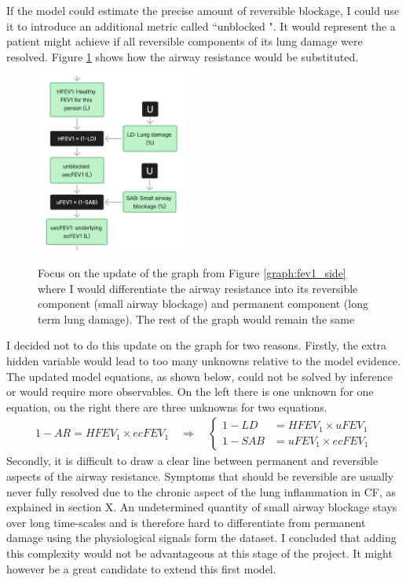 If the model could estimate the precise amount of reversible blockage, I could use it to introduce an additional metric called “unblocked \F". It would represent the \F a patient might achieve if all reversible components of its lung damage were resolved. Figure \ref{graph:unblocked_fev1} shows how the airway resistance would be substituted. 
\begin{figure}[!h]
    \caption{Focus on the update of the graph from Figure \ref{graph:fev1_side} where I would differentiate the airway resistance into its reversible component (small airway blockage) and permanent component (long term lung damage). The rest of the graph would remain the same}
    \centering
    \includegraphics[width=50mm]{Chapter1/Figs/unblocked_fev1_model_structure.png}
    \label{graph:unblocked_fev1}
\end{figure}
I decided not to do this update on the graph for two reasons. Firstly, the extra hidden variable would lead to too many unknowns relative to the model evidence. The updated model equations, as shown below, could not be solved by inference or would require more observables. On the left there is one unknown for one equation, on the right there are three unknowns for two equations.
\begin{align*}
1-AR = H\!F\!EV_1 \times ecF\!EV_1 \quad \Rightarrow \quad 
\left\{
\begin{aligned}
1-LD &= H\!F\!EV_1 \times uF\!EV_1 \\
1-SAB &= uF\!EV_1 \times ecF\!EV_1
\end{aligned}
\right.
\end{align*}
Secondly, it is difficult to draw a clear line between permanent and reversible aspects of the airway resistance. Symptoms that should be reversible are usually never fully resolved due to the chronic aspect of the lung inflammation in CF, as explained in section X. An undetermined quantity of small airway blockage stays over long time-scales and is therefore hard to differentiate from permanent damage using the physiological signals form the dataset. I concluded that adding this complexity would not be advantageous at this stage of the project. It might however be a great candidate to extend this first model.

